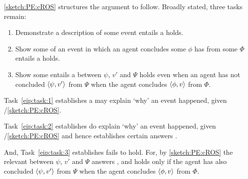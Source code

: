 \begin{note}
  \autoref{sketch:PE:cROS} structures the argument to follow.
  Broadly stated, three tasks remain:

  \begin{enumerate}[label=\arabic*., ref=\arabic*]
  \item
    \label{eip:task:1}
    Demonstrate a description of some event entails a \ros{} holds.
  \item
    \label{eip:task:2}
    Show some \se{} of an event in which an agent concludes some  \(\phi\) has  from some  \(\Phi\) entails a \ros{} holds.
  \item
    \label{eip:task:3}
    Show some \se{} entails a \ros{} between \(\psi\), \(v'\) and \(\Psi\) holds even when an agent has not concluded \(\langle\psi, v'\rangle\) from \(\Psi\) when the agent concludes \(\langle\phi, v\rangle\) from \(\Phi\).
  \end{enumerate}

  Task~\ref{eip:task:1} establishes a  may explain `why' an event happened, given \progExII{}/\autoref{sketch:PE:cROS}.

  Task~\ref{eip:task:2} establishes  do explain `why' an event happened, given \progExII{}/\autoref{sketch:PE:cROS} and hence establishes certain answers \qWhy{}.

  And, Task~\ref{eip:task:3} establishes \issueInclusion{} fails to hold.
  For, by \autoref{sketch:PE:cROS} the relevant \ros{} between \(\psi\), \(v'\) and \(\Psi\) answers \qWhy{}, and \issueInclusion{} holds only if the agent has also concluded \(\langle\psi, v'\rangle\) from \(\Psi\) when the agent concludes \(\langle\phi, v\rangle\) from \(\Phi\).
\end{note}






